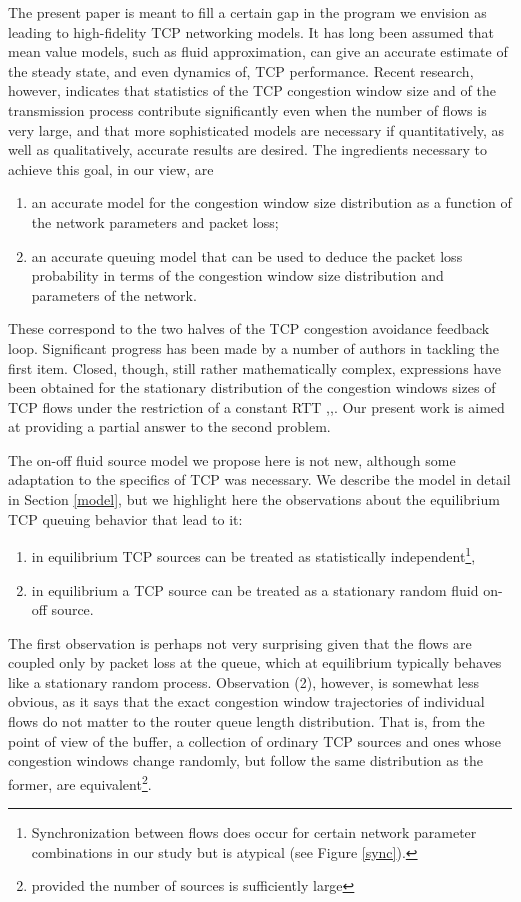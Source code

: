 \documentclass{IEEEtran}[10pt,letterpaper,conference]
\begin{document}
The present paper is meant to fill a certain gap in the program we envision as leading to high-fidelity TCP networking models. It has long been assumed that mean value models, such as fluid approximation, can give an accurate estimate of the steady state, and even dynamics of, TCP performance. Recent research, however, indicates that statistics of the TCP congestion window size and of the transmission process contribute significantly even when the number of flows is very large, and that more sophisticated models are necessary if quantitatively, as well as qualitatively, accurate results are desired. The ingredients necessary to achieve this goal, in our view, are
\begin{enumerate}
\item[i)] an accurate model for the congestion window size distribution as a function of the network parameters and packet loss;
\item[ii)] an accurate queuing model that can be used to deduce the packet loss probability in terms of the congestion window size distribution and parameters of the network.
\end{enumerate}
These correspond to the two halves of the TCP congestion avoidance feedback loop. Significant progress has been made by a number of authors in tackling the first item. Closed, though, still rather mathematically complex, expressions have been obtained for the stationary distribution of the congestion windows sizes of TCP flows under the restriction of a constant RTT \cite{BacMcDonJul},\cite{DumFabPhi},\cite{ChaDeVle}. Our present work is aimed at providing a partial answer to the second problem.

The on-off fluid source model we propose here is not new, although some adaptation to the specifics of TCP was necessary. We describe the model in detail in Section \ref{model}, but we highlight here the observations about the equilibrium TCP queuing behavior that lead to it:
\begin{enumerate}
\item[1)] in equilibrium TCP sources can be treated as statistically independent\footnote{Synchronization between flows does occur for certain network parameter combinations in our study but is atypical (see Figure \ref{sync}).},
\item[2)] in equilibrium a TCP source can be treated as a stationary random fluid on-off source.
\end{enumerate}
The first observation is perhaps not very surprising given that the flows are coupled only by packet loss at the queue, which at equilibrium typically behaves like a stationary random process. Observation (2), however, is somewhat less obvious, as it says that the exact congestion window trajectories of individual flows do not matter to the router queue length distribution. That is, from the point of view of the buffer, a collection of ordinary TCP sources and ones whose congestion windows change randomly, but follow the same distribution as the former, are equivalent\footnote{provided the number of sources is sufficiently large}.
\end{document}
